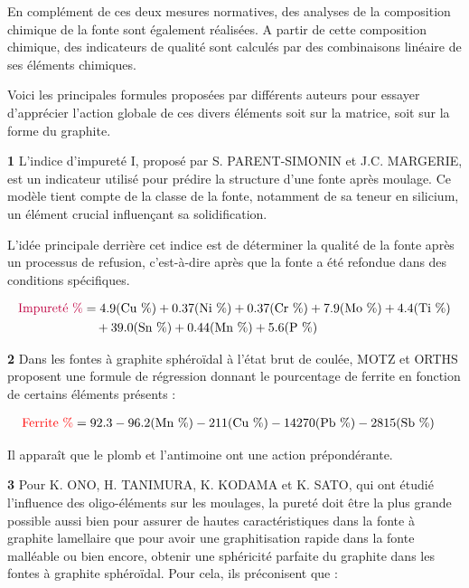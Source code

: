 \documentclass[12pt]{article}
\begin{document}
En complément de ces deux mesures normatives, 
des analyses de la composition chimique de la fonte sont également 
réalisées. A partir de cette composition chimique, des indicateurs de 
qualité sont calculés par des combinaisons linéaire de ses éléments 
chimiques.

Voici les principales formules proposées par 
différents auteurs pour essayer d'apprécier l'action globale de ces divers 
éléments soit sur la matrice, soit sur la forme du graphite.



\textbf{1} L’indice d’impureté I, proposé par S. PARENT-SIMONIN et 
J.C. MARGERIE, est un indicateur utilisé pour prédire la structure 
d'une fonte après moulage. Ce modèle tient compte de la classe de la 
fonte, notamment de sa teneur en silicium, un élément crucial influençant 
sa solidification.

L'idée principale derrière cet indice est de déterminer la qualité de 
la fonte après un processus de refusion, c'est-à-dire après que 
la fonte a été refondue dans des conditions spécifiques.

 
\begin{align*}
    \textcolor{purple}{\text{Impureté \%}} &= 4.9 (\text{Cu \%}) + 0.37 (\text{Ni \%}) + 0.37 (\text{Cr \%}) + 7.9 (\text{Mo \%}) + 4.4 (\text{Ti \%})\\
    &\quad + 39.0 (\text{Sn \%}) + 0.44 (\text{Mn \%}) + 5.6 (\text{P \%})
\end{align*}



\textbf{2} Dans les fontes à graphite sphéroïdal à l’état brut de 
coulée, MOTZ et ORTHS proposent une formule de régression donnant le 
pourcentage de ferrite en fonction de certains éléments présents :


\begin{align*}
    \textcolor{red}{\text{Ferrite \%}} &= 92.3 - 96.2 (\text{Mn \%}) - 211 (\text{Cu \%}) - 14270 (\text{Pb \%}) - 2815 (\text{Sb \%})
\end{align*}


Il apparaît que le plomb et l’antimoine ont une action prépondérante.



\textbf{3} Pour K. ONO, H. TANIMURA, K. KODAMA et K. SATO, qui ont 
étudié l’influence des oligo-éléments sur les moulages, la pureté doit 
être la plus grande possible aussi bien pour assurer de hautes 
caractéristiques dans la fonte à graphite lamellaire que pour avoir 
une graphitisation rapide dans la fonte malléable ou bien encore, 
obtenir une sphéricité parfaite du graphite dans les fontes à graphite 
sphéroïdal. Pour cela, ils préconisent que :
\end{document}
